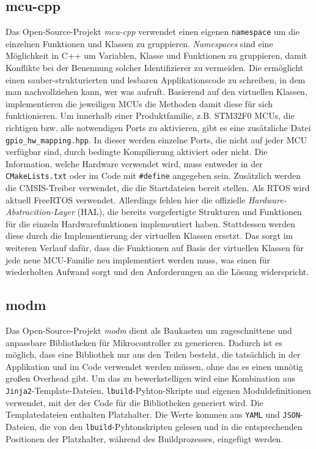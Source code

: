 \subsection{mcu-cpp}
Das Open-Source-Projekt \emph{mcu-cpp} verwendet einen eigenen \texttt{namespace} um die einzelnen Funktionen und Klassen zu gruppieren.
\emph{Namespaces} sind eine Möglichkeit in C++ um Variablen, Klasse und Funktionen zu gruppieren, damit Konflikte bei der Benennung solcher Identifizierer zu vermeiden.
Die ermöglicht einen sauber-strukturierten und lesbaren Applikationscode zu schreiben, in dem man nachvollziehen kann, wer was aufruft.
Basierend auf den virtuellen Klassen, implementieren die jeweiligen MCUs die Methoden damit diese für sich funktionieren.
Um innerhalb einer Produktfamilie, z.B. STM32F0 MCUs, die richtigen bzw. alle notwendigen Ports zu aktivieren, gibt es eine zusätzliche Datei \texttt{gpio\_hw\_mapping.hpp}.
In dieser werden einzelne Ports, die nicht auf jeder MCU verfügbar sind, durch bedingte Kompilierung aktiviert oder nicht.
Die Information, welche Hardware verwendet wird, muss entweder in der \texttt{CMakeLists.txt} oder im Code mit \texttt{\#define} angegeben sein.
Zusätzlich werden die CMSIS-Treiber verwendet, die die Startdateien bereit stellen.
Als RTOS wird aktuell FreeRTOS verwendet.
Allerdings fehlen hier die offizielle \emph{Hardware-Abstracition-Layer} (HAL), die bereits vorgefertigte Strukturen und Funktionen für die einzeln Hardwarefunktionen implementiert haben.
Stattdessen werden diese durch die Implementierung der virtuellen Klassen ersetzt.
Das sorgt im weiteren Verlauf dafür, dass die Funktionen auf Basis der virtuellen Klassen für jede neue MCU-Familie neu implementiert werden muss, was einen für wiederholten Aufwand sorgt und den Anforderungen an die Lösung widerspricht.



\subsection{modm}
Das Open-Source-Projekt \emph{modm} dient als Baukasten um zugeschnittene und anpassbare Bibliotheken für Mikrocontroller zu generieren.
Dadurch ist es möglich, dass eine Bibliothek nur aus den Teilen besteht, die tatsächlich in der Applikation und im Code verwendet werden müssen, ohne das es einen unnötig großen Overhead gibt.
Um das zu bewerkstelligen wird eine Kombination aus \texttt{Jinja2}-Template-Dateien, \texttt{lbuild}-Pyhton-Skripte und eigenen Moduldefinitionen verwendet, mit der der Code für die Bibliotheken generiert wird.
Die Templatedateien enthalten Platzhalter.
Die Werte kommen aus \texttt{YAML} und \texttt{JSON}-Dateien, die von den \texttt{lbuild}-Pyhtonskripten gelesen und in die entsprechenden Positionen der Platzhalter, während des Buildprozesses, eingefügt werden.
 
